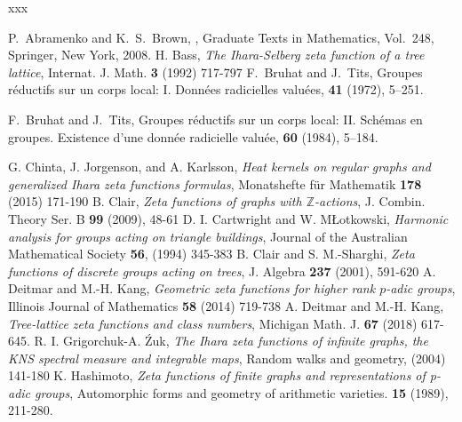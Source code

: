 \documentclass[11pt]{amsart}
\theoremstyle{definition}
\theoremstyle{remark}
\numberwithin{equation}{section}
\begin{document}
\begin{thebibliography}{xxx}

P.~Abramenko and K.~S.~Brown,
,
\newblock Graduate Texts in Mathematics, Vol.~248,
\newblock Springer, New York, 2008.
 H. Bass, \emph{The Ihara-Selberg zeta function of a tree lattice}, Internat. J. Math. \textbf{3} (1992) 717-797
F.~Bruhat and J.~Tits,
\newblock Groupes r\'eductifs sur un corps local: I. Donn\'ees radicielles valu\'ees,
 \textbf{41} (1972), 5--251.

F.~Bruhat and J.~Tits,
\newblock Groupes r\'eductifs sur un corps local: II. Sch\'emas en groupes. Existence d'une donn\'ee radicielle valu\'ee,
 \textbf{60} (1984), 5--184.

 G. Chinta, J. Jorgenson, and A. Karlsson, \emph{Heat kernels on regular graphs and generalized Ihara zeta functions formulas}, Monatshefte für Mathematik \textbf{178} (2015) 171-190
 B. Clair, \emph{Zeta functions of graphs with $\mathbb{Z}$-actions}, J. Combin. Theory Ser. B \textbf{99} (2009), 48-61
 D. I. Cartwright and W. MŁotkowski, \emph{Harmonic analysis for groups acting on triangle buildings}, Journal of the Australian Mathematical Society \textbf{56}, (1994) 345-383
 B. Clair and S. M.-Sharghi, \emph{Zeta functions of discrete groups acting on trees}, J. Algebra \textbf{237} (2001), 591-620
  A. Deitmar and M.-H. Kang, \emph{Geometric zeta functions for higher rank $p$-adic groups}, Illinois Journal of Mathematics \textbf{58} (2014) 719-738
   A. Deitmar and M.-H. Kang, \emph{Tree-lattice zeta functions and class numbers}, Michigan Math. J. \textbf{67} (2018) 617-645.
 R. I. Grigorchuk-A. \'{Z}uk, \emph{The Ihara zeta functions of infinite graphs, the KNS spectral measure and integrable maps}, Random walks and geometry, (2004) 141-180
  K. Hashimoto, \emph{Zeta functions of finite graphs and representations of p-adic groups}, Automorphic forms and geometry of arithmetic varieties. \textbf{15} (1989), 211-280.


\end{thebibliography}
\end{document}
